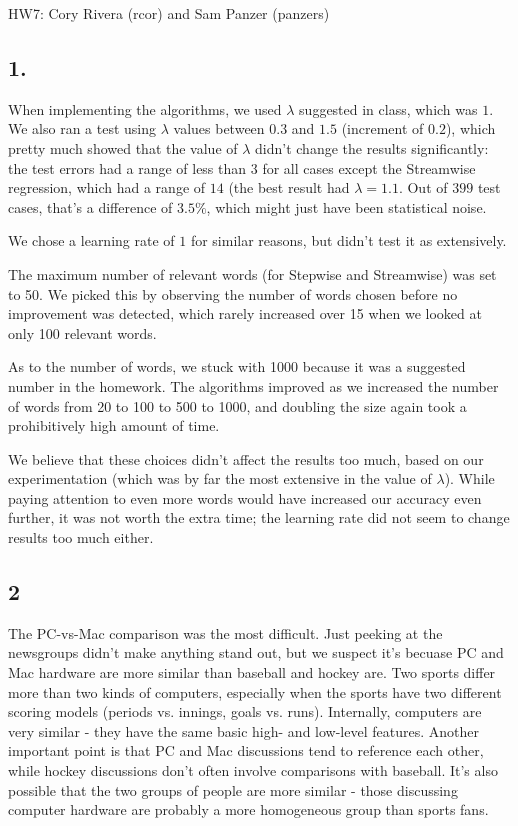 \documentclass{article}
\begin{document}
\begin{center}
  HW7: Cory Rivera (rcor) and Sam Panzer (panzers)
\end{center}

\subsection{1.}
  When implementing the algorithms, we used $\lambda$ suggested in class, which was $1$.
  We also ran a test using $\lambda$ values between $0.3$ and $1.5$ (increment of $0.2$), which pretty much showed that the value of $\lambda$ didn't change the results significantly:
  the test errors had a range of less than $3$ for all cases except the Streamwise regression, which had a range of $14$ (the best result had $\lambda=1.1$.
  Out of $399$ test cases, that's a difference of $3.5\%$, which might just have been statistical noise.

  We chose a learning rate of $1$ for similar reasons, but didn't test it as extensively.

  The maximum number of relevant words (for Stepwise and Streamwise) was set to 50.
  We picked this by observing the number of words chosen before no improvement was detected, which rarely increased over 15 when we looked at only 100 relevant words.

  As to the number of words, we stuck with 1000 because it was a suggested number in the homework. The algorithms improved as we increased the number of words from 20 to 100 to 500 to 1000, and doubling the size again took a prohibitively high amount of time.

  We believe that these choices didn't affect the results too much, based on our experimentation (which was by far the most extensive in the value of $\lambda$). While paying attention to even more words would have increased our accuracy even further, it was not worth the extra time; the learning rate did not seem to change results too much either.

\subsection{2}
The PC-vs-Mac comparison was the most difficult. Just peeking at the newsgroups didn't make anything stand out, but we suspect it's becuase PC and Mac hardware are more similar than baseball and hockey are.
Two sports differ more than two kinds of computers, especially when the sports have two different scoring models (periods vs. innings, goals vs. runs).
Internally, computers are very similar - they have the same basic high- and low-level features.
Another important point is that PC and Mac discussions tend to reference each other, while hockey discussions don't often involve comparisons with baseball.
It's also possible that the two groups of people are more similar - those discussing computer hardware are probably a more homogeneous group than sports fans.
\end{document}
